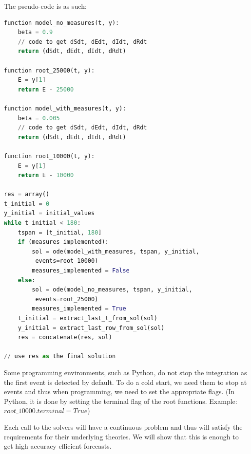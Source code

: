 The pseudo-code is as such:

\begin{minipage}{\linewidth}
\centering
\begin{lstlisting}[language=Python]
function model_no_measures(t, y):
    beta = 0.9
    // code to get dSdt, dEdt, dIdt, dRdt
    return (dSdt, dEdt, dIdt, dRdt)

function root_25000(t, y):
    E = y[1]
    return E - 25000

function model_with_measures(t, y):
    beta = 0.005
    // code to get dSdt, dEdt, dIdt, dRdt
    return (dSdt, dEdt, dIdt, dRdt)

function root_10000(t, y):
    E = y[1]
    return E - 10000

res = array()
t_initial = 0
y_initial = initial_values
while t_initial < 180:
    tspan = [t_initial, 180]
    if (measures_implemented):
        sol = ode(model_with_measures, tspan, y_initial,
         events=root_10000)
        measures_implemented = False
    else:
        sol = ode(model_no_measures, tspan, y_initial,
         events=root_25000)
        measures_implemented = True
    t_initial = extract_last_t_from_sol(sol)
    y_initial = extract_last_row_from_sol(sol)
    res = concatenate(res, sol)

// use res as the final solution
\end{lstlisting}
\end{minipage}

Some programming environments, such as Python, do not stop the integration as the first event is detected by default. To do a cold start, we need them to stop at events and thus when programming, we need to set the appropriate flags. (In Python, it is done by setting the terminal flag of the root functions. Example: $root\_10000.terminal = True$)

Each call to the solvers will have a continuous problem and thus will satisfy the requirements for their underlying theories. We will show that this is enough to get high accuracy efficient forecasts.  

